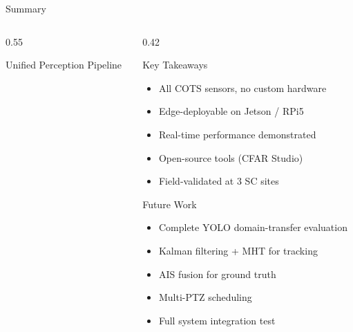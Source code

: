 \documentclass[aspectratio=169, 10pt]{beamer}
\begin{document}
\begin{frame}{Summary}
  \begin{columns}[T]
    \begin{column}{0.55\textwidth}
      \begin{block}{Unified Perception Pipeline}
        \centering
      \end{block}
    \end{column}
    \begin{column}{0.42\textwidth}
      \begin{block}{Key Takeaways}
        {\scriptsize
        \begin{itemize}\setlength{\itemsep}{0pt}\setlength{\topsep}{0pt}
          \item All COTS sensors, no custom hardware
          \item Edge-deployable on Jetson / RPi5
          \item Real-time performance demonstrated
          \item Open-source tools (CFAR Studio)
          \item Field-validated at 3 SC sites
        \end{itemize}
        }
      \end{block}
      \vspace{0.1em}
      \begin{block}{Future Work}
        {\scriptsize
        \begin{itemize}\setlength{\itemsep}{0pt}\setlength{\topsep}{0pt}
          \item Complete YOLO domain-transfer evaluation
          \item Kalman filtering + MHT for tracking
          \item AIS fusion for ground truth
          \item Multi-PTZ scheduling
          \item Full system integration test
        \end{itemize}
        }
      \end{block}
    \end{column}
  \end{columns}
\end{frame}
\end{document}

